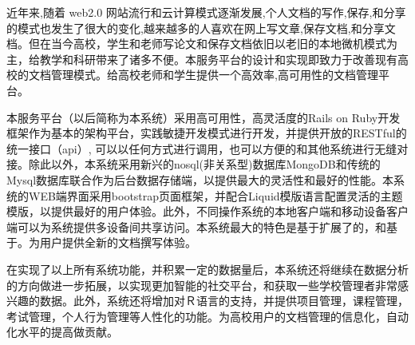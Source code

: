 
\begin{cabstract}
近年来,随着 web2.0 网站流行和云计算模式逐渐发展,个人文档的写作,保存,和分享的模式也发生了很大的变化,越来越多的人喜欢在网上写文章,保存文档,和分享文档。但在当今高校，学生和老师写论文和保存文档依旧以老旧的本地微机模式为主，给教学和科研带来了诸多不便。本服务平台的设计和实现即致力于改善现有高校的文档管理模式。给高校老师和学生提供一个高效率,高可用性的文档管理平台。

本服务平台（以后简称为本系统）采用高可用性，高灵活度的Rails on Ruby开发框架作为基本的架构平台，实践敏捷开发模式进行开发，并提供开放的RESTful的统一接口（api）, 可以以任何方式进行调用，也可以方便的和其他系统进行无缝对接。除此以外，本系统采用新兴的nosql(非关系型)数据库MongoDB和传统的Mysql数据库联合作为后台数据存储端，以提供最大的灵活性和最好的性能。本系统的WEB端界面采用bootstrap页面框架，并配合Liquid模版语言配置灵活的主题模版，以提供最好的用户体验。此外，不同操作系统的本地客户端和移动设备客户端可以为系统提供多设备间共享访问。本系统最大的特色是基于扩展了的，和基于。为用户提供全新的文档撰写体验。

在实现了以上所有系统功能，并积累一定的数据量后，本系统还将继续在数据分析的方向做进一步拓展，以实现更加智能的社交平台，和获取一些学校管理者非常感兴趣的数据。此外，系统还将增加对Ｒ语言的支持，并提供项目管理，课程管理，考试管理，个人行为管理等人性化的功能。为高校用户的文档管理的信息化，自动化水平的提高做贡献。
\end{cabstract}


